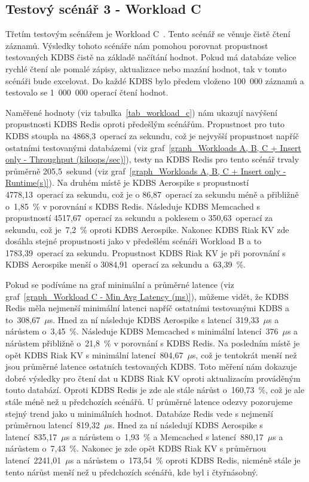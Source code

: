 \documentclass[czech,master,dept460,male,csharp,cpdeclaration]{diploma}
\begin{document}
	\subsection{Testový scénář 3 - Workload C}
	
	Třetím testovým scénářem je Workload C~\cite{workloads}. Tento scénář se věnuje čistě čtení záznamů. Výsledky tohoto scénáře nám pomohou porovnat propustnost testovaných KDBS čistě na základě načítání hodnot. Pokud má databáze velice rychlé čtení ale pomalé zápisy, aktualizace nebo mazání hodnot, tak v tomto scénáři bude excelovat. Do každé KDBS bylo předem vloženo 100~000 záznamů a testovalo se 1~000~000 operací čtení hodnot.
	
	Naměřené hodnoty (viz tabulka~\ref{tab_workload_c}) nám ukazují navýšení propustnosti KDBS Redis oproti předešlým scénářům. Propustnost pro tuto KDBS stoupla na 4868,3~operací za sekundu, což je nejvyšší propustnost napříč ostatními testovanými databázemi (viz graf~\ref{graph_Workloads A, B, C + Insert only - Throughput (kiloops/sec)}), testy na KDBS Redis pro tento scénář trvaly průměrně 205,5~sekund (viz graf~\ref{graph_Workloads A, B, C + Insert only - Runtime(s)}). Na druhém místě je KDBS Aerospike s propustností 4778,13~operací za sekundu, což je o 86,87~operací za sekundu méně a přibližně o~1,85~\% v porovnání s KDBS Redis. Následuje KDBS Memcached s propustností 4517,67~operací za sekundu a poklesem o 350,63~operací za sekundu, což je~7,2~\% oproti KDBS Aerospike. Nakonec KDBS Riak KV zde dosáhla stejné propustnosti jako v předešlém scénáři Workload B a to 1783,39~operací za sekundu. Propustnost KDBS Riak KV je při porovnání s KDBS Aerospike menší o 3084,91~operací za sekundu a~63,39~\%.
	
	Pokud se podíváme na graf minimální a průměrné latence (viz graf~\ref{graph_Workload C - Min Avg Latency (ms)}), můžeme vidět, že KDBS Redis měla nejmenší minimální latenci napříč ostatními testovanými KDBS a to~308,67~$\mu$s. Hned za ní následuje KDBS Aerospike s latencí~319,33~$\mu$s a nárůstem o~3,45~\%. Následuje KDBS Memcached s minimální latencí~376~$\mu$s a nárůstem přibližně o~21,8~\% v porovnání s KDBS Redis. Na posledním místě je opět KDBS Riak KV s minimální latencí~804,67~$\mu$s, což je tentokrát menší než jsou průměrné latence ostatních testovaných KDBS. Toto měření nám dokazuje dobré výsledky pro čtení dat u KDBS Riak KV oproti aktualizacím prováděným touto databází. Oproti KDBS Redis je zde ale stále nárůst o~160,73~\%, což je ale stále méně než u předchozích scénářů. U průměrné latence odezvy pozorujeme stejný trend jako u minimálních hodnot. Databáze Redis vede s nejmenší průměrnou latencí~819,32~$\mu$s. Hned za ní následují KDBS Aerospike s latencí~835,17~$\mu$s a nárůstem o~1,93~\% a Memcached s latencí~880,17~$\mu$s a nárůstem o~7,43~\%. Nakonec je zde opět KDBS Riak KV s průměrnou latencí~2241,01~$\mu$s a nárůstem o~173,54~\% oproti KDBS Redis, nicméně stále je tento nárůst menší než u předchozích scénářů, kde byl i čtyřnásobný.
	
\end{document}
